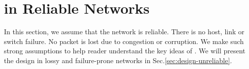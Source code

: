 \section{\sys in Reliable Networks}
\label{sec:design-reliable}


In this section, we assume that the network is reliable. There is no host, link or switch failure. No packet is lost due to congestion or corruption. We make such strong assumptions to help reader understand the key ideas of \sys. We will present the design in lossy and failure-prone networks in Sec.\ref{sec:design-unreliable}.









